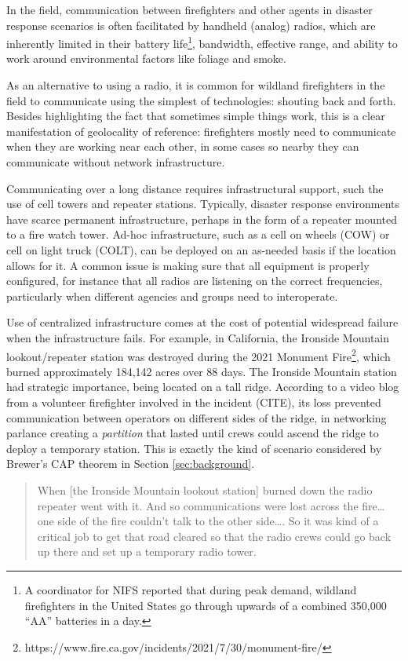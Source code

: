 \documentclass[]             %
{NASA}                       %
\theoremstyle{definition}
\begin{document}
In the field, communication between firefighters and other agents in
disaster response scenarios is often facilitated by handheld (analog)
radios, which are inherently limited in their battery life\footnote{A
  coordinator for NIFS reported that during peak demand, wildland
  firefighters in the United States go through upwards of a combined
  350,000 ``AA'' batteries in a day.}, bandwidth, effective range, and
ability to work around environmental factors like foliage and smoke.

As an alternative to using a radio, it is common for wildland
firefighters in the field to communicate using the simplest of
technologies: shouting back and forth. Besides highlighting the fact
that sometimes simple things work, this is a clear manifestation of
geolocality of reference: firefighters mostly need to communicate when
they are working near each other, in some cases so nearby they can
communicate without network infrastructure.

Communicating over a long distance requires infrastructural support,
such the use of cell towers and repeater stations. Typically, disaster
response environments have scarce permanent infrastructure, perhaps in
the form of a repeater mounted to a fire watch tower. Ad-hoc
infrastructure, such as a cell on wheels (COW) or cell on light truck
(COLT), can be deployed on an as-needed basis if the location allows for
it. A common issue is making sure that all equipment is properly
configured, for instance that all radios are listening on the correct
frequencies, particularly when different agencies and groups need to
interoperate.

Use of centralized infrastructure comes at the cost of potential
widespread failure when the infrastructure fails. For example, in
California, the Ironside Mountain lookout/repeater station was destroyed
during the 2021 Monument Fire\footnote{https://www.fire.ca.gov/incidents/2021/7/30/monument-fire/},
which burned approximately 184,142 acres over 88 days. The Ironside
Mountain station had strategic importance, being located on a tall
ridge. According to a video blog from a volunteer firefighter involved
in the incident (CITE), its loss prevented communication between
operators on different sides of the ridge, in networking parlance
creating a \emph{partition} that lasted until crews could ascend the
ridge to deploy a temporary station. This is exactly the kind of
scenario considered by Brewer's CAP theorem in Section
\ref{sec:background}.

\begin{quote}
When {[}the Ironside Mountain lookout station{]} burned down the radio
repeater went with it. And so communications were lost across the
fire\ldots{} one side of the fire couldn't talk to the other side\ldots.
So it was kind of a critical job to get that road cleared so that the
radio crews could go back up there and set up a temporary radio tower.
\end{quote}
\end{document}
